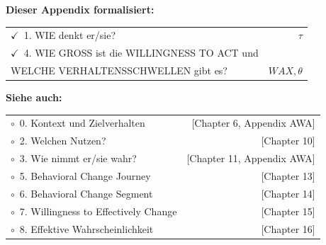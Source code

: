\begin{tcolorbox}[
  title={\textbf{Die 9 Fragen des EBF — Appendix REA Formalisierung}},
  colback=green!3,
  colframe=green!40!black,
  fonttitle=\bfseries\sffamily,
  coltitle=white,
  boxrule=0.8pt,
  arc=2mm
]
\small\sffamily
\textbf{Dieser Appendix formalisiert:}\\[4pt]
\begin{tabular}{@{}p{}r@{}}
$\checkmark$~1. WIE denkt er/sie? & $\tau$ \\
$\checkmark$~4. WIE GROSS ist die WILLINGNESS TO ACT und & \\
\quad WELCHE VERHALTENSSCHWELLEN gibt es? & $WAX, \theta$ \\
\end{tabular}

\vspace{6pt}
\textbf{Siehe auch:}\\[4pt]
\begin{tabular}{@{}p{}r@{}}
$\circ$~0. Kontext und Zielverhalten & [Chapter 6, Appendix AWA] \\
$\circ$~2. Welchen Nutzen? & [Chapter 10] \\
$\circ$~3. Wie nimmt er/sie wahr? & [Chapter 11, Appendix AWA] \\
$\circ$~5. Behavioral Change Journey & [Chapter 13] \\
$\circ$~6. Behavioral Change Segment & [Chapter 14] \\
$\circ$~7. Willingness to Effectively Change & [Chapter 15] \\
$\circ$~8. Effektive Wahrscheinlichkeit & [Chapter 16] \\
\end{tabular}
\end{tcolorbox}


